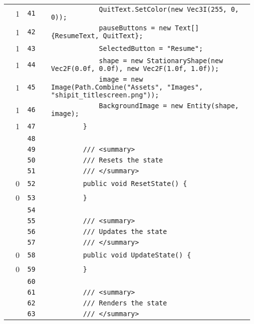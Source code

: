 \documentclass[a4paper,landscape,10pt]{article}
\begin{document}
\begin{longtable}[l]{lrrll}
\cellcolor{green} & 1 & \verb~41~ & & \verb~            QuitText.SetColor(new Vec3I(255, 0, 0));~\\
\cellcolor{green} & 1 & \verb~42~ & & \verb~            pauseButtons = new Text[] {ResumeText, QuitText};~\\
\cellcolor{green} & 1 & \verb~43~ & & \verb~            SelectedButton = "Resume";~\\
\cellcolor{green} & 1 & \verb~44~ & & \verb~            shape = new StationaryShape(new Vec2F(0.0f, 0.0f), new Vec2F(1.0f, 1.0f));~\\
\cellcolor{green} & 1 & \verb~45~ & & \verb~            image = new Image(Path.Combine("Assets", "Images", "shipit_titlescreen.png"));~\\
\cellcolor{green} & 1 & \verb~46~ & & \verb~            BackgroundImage = new Entity(shape, image);~\\
\cellcolor{green} & 1 & \verb~47~ & & \verb~        }~\\
\cellcolor{gray} &  & \verb~48~ & & \verb~~\\
\cellcolor{gray} &  & \verb~49~ & & \verb~        /// <summary>~\\
\cellcolor{gray} &  & \verb~50~ & & \verb~        /// Resets the state~\\
\cellcolor{gray} &  & \verb~51~ & & \verb~        /// </summary>~\\
\cellcolor{red} & 0 & \verb~52~ & & \verb~        public void ResetState() {~\\
\cellcolor{red} & 0 & \verb~53~ & & \verb~        }~\\
\cellcolor{gray} &  & \verb~54~ & & \verb~~\\
\cellcolor{gray} &  & \verb~55~ & & \verb~        /// <summary>~\\
\cellcolor{gray} &  & \verb~56~ & & \verb~        /// Updates the state~\\
\cellcolor{gray} &  & \verb~57~ & & \verb~        /// </summary>~\\
\cellcolor{red} & 0 & \verb~58~ & & \verb~        public void UpdateState() {~\\
\cellcolor{red} & 0 & \verb~59~ & & \verb~        }~\\
\cellcolor{gray} &  & \verb~60~ & & \verb~~\\
\cellcolor{gray} &  & \verb~61~ & & \verb~        /// <summary>~\\
\cellcolor{gray} &  & \verb~62~ & & \verb~        /// Renders the state~\\
\cellcolor{gray} &  & \verb~63~ & & \verb~        /// </summary>~\\

\end{longtable}
\end{document}
